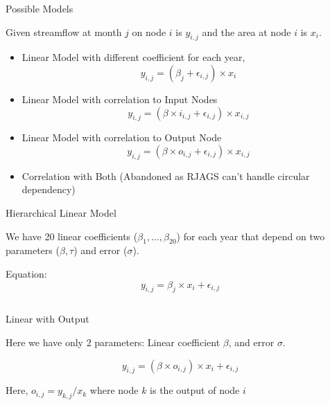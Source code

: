 \documentclass{beamer}
\begin{document}
\begin{frame}{Possible Models}

  Given streamflow at month \(j\) on node \(i\) is \(y_{i,j}\) and the area at node \(i\) is \(x_{i}\).

  \begin{itemize}
  \item Linear Model with different coefficient for each year,
    \begin{equation*}
      y_{i,j} = (\beta_{j} + \epsilon_{i,j}) \times x_{i}
    \end{equation*}
    
  \item Linear Model with correlation to Input Nodes
    \begin{equation*}
      y_{i,j} = (\beta \times i_{i,j} + \epsilon_{i,j}) \times x_{i,j}
    \end{equation*}
    
  \item Linear Model with correlation to Output Node
    \begin{equation*}
      y_{i,j} = (\beta \times o_{i,j} + \epsilon_{i,j}) \times x_{i,j}
    \end{equation*}

  \item Correlation with Both ({\color{red}Abandoned} as RJAGS can't handle circular dependency)
  \end{itemize}

\end{frame}

\begin{frame}[containsverbatim]{Hierarchical Linear Model}

  We have 20 linear coefficients (\(\beta_1,\hdots,\beta_{20}\)) for each year that depend on two parameters (\(\beta, \tau\)) and error (\(\sigma\)).

  Equation:
    \begin{equation*}
      y_{i,j} = \beta_{j} \times x_{i} + \epsilon_{i,j}
    \end{equation*}

    \vspace{0.2cm}
    
\inputminted{jags}{jags/linear.jags}
\end{frame}

\begin{frame}{Linear with Output}

  Here we have only 2 parameters: Linear coefficient \(\beta\), and error \(\sigma\).

    \begin{equation*}
      y_{i,j} = (\beta \times o_{i,j}) \times x_{i} + \epsilon_{i,j}
    \end{equation*}

    Here, \(o_{i,j} = y_{k,j} / x_k\) where node \(k\) is the output of node \(i\)
\end{frame}
\end{document}
